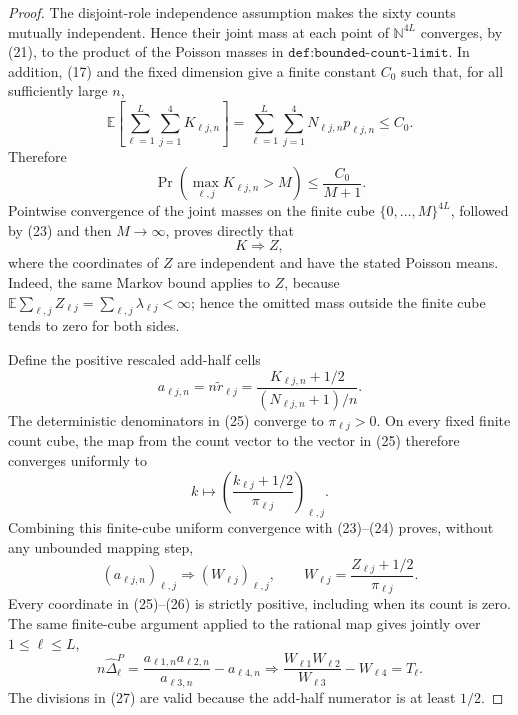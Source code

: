 \documentclass{article}
\begin{document}
\begin{proof}
The disjoint-role independence assumption makes the sixty counts mutually independent.  Hence their joint mass at each point of \(\mathbb N^{4L}\) converges, by (21), to the product of the Poisson masses in \(\texttt{def:bounded-count-limit}\).  In addition, (17) and the fixed dimension give a finite constant \(C_0\) such that, for all sufficiently large \(n\),
\[
\mathbb E\!\left[\sum_{\ell=1}^{L}\sum_{j=1}^{4}K_{\ell j,n}\right]
=\sum_{\ell=1}^{L}\sum_{j=1}^{4}N_{\ell j,n}p_{\ell j,n}
\leq C_0.
\tag{22}
\]
Therefore
\[
\Pr\!\left(\max_{\ell,j}K_{\ell j,n}>M\right)
\leq\frac{C_0}{M+1}.
\tag{23}
\]
Pointwise convergence of the joint masses on the finite cube \(\{0,\ldots,M\}^{4L}\), followed by (23) and then \(M\to\infty\), proves directly that
\[
K\Rightarrow Z,
\tag{24}
\]
where the coordinates of \(Z\) are independent and have the stated Poisson means.  Indeed, the same Markov bound applies to \(Z\), because \(\mathbb E\sum_{\ell,j}Z_{\ell j}=\sum_{\ell,j}\lambda_{\ell j}<\infty\); hence the omitted mass outside the finite cube tends to zero for both sides.

Define the positive rescaled add-half cells
\[
a_{\ell j,n}=n\widetilde r_{\ell j}
=\frac{K_{\ell j,n}+1/2}{(N_{\ell j,n}+1)/n}.
\tag{25}
\]
The deterministic denominators in (25) converge to \(\pi_{\ell j}>0\).  On every fixed finite count cube, the map from the count vector to the vector in (25) therefore converges uniformly to
\[
k\longmapsto\left(\frac{k_{\ell j}+1/2}{\pi_{\ell j}}\right)_{\ell,j}.
\]
Combining this finite-cube uniform convergence with (23)--(24) proves, without any unbounded mapping step,
\[
(a_{\ell j,n})_{\ell,j}\Rightarrow
(W_{\ell j})_{\ell,j},
\qquad W_{\ell j}=\frac{Z_{\ell j}+1/2}{\pi_{\ell j}}.
\tag{26}
\]
Every coordinate in (25)--(26) is strictly positive, including when its count is zero.  The same finite-cube argument applied to the rational map gives jointly over \(1\leq\ell\leq L\),
\[
n\widehat\Delta^P_{\ell}
=\frac{a_{\ell1,n}a_{\ell2,n}}{a_{\ell3,n}}-a_{\ell4,n}
\Rightarrow
\frac{W_{\ell1}W_{\ell2}}{W_{\ell3}}-W_{\ell4}
=T_{\ell}.
\tag{27}
\]
The divisions in (27) are valid because the add-half numerator is at least \(1/2\).


\end{proof}
\end{document}
